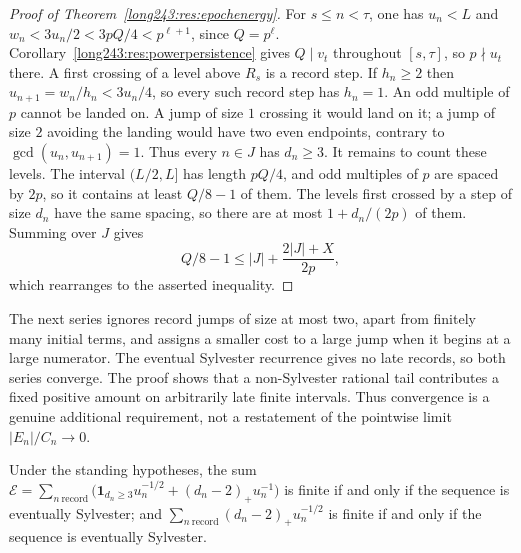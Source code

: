 \documentclass[11pt]{article}
\begin{document}
\begin{proof}[Proof of Theorem~\ref{long243:res:epochenergy}]
For $s\le n<\tau$, one has $u_n<L$ and
$w_n<3u_n/2<3pQ/4<p^{\ell+1}$, since $Q=p^{\ell}$.
Corollary~\ref{long243:res:powerpersistence} gives $Q\mid v_t$ throughout
$[s,\tau]$, so $p\nmid u_t$ there. A first crossing of a level above $R_s$
is a record step. If $h_n\ge2$ then $u_{n+1}=w_n/h_n<3u_n/4$, so every
such record step has $h_n=1$.
An odd multiple of $p$ cannot be landed on. A jump of size $1$ crossing it
would land on it; a jump of size $2$ avoiding the landing would have two
even endpoints, contrary to $\gcd(u_n,u_{n+1})=1$. Thus every $n\in J$
has $d_n\ge3$.
It remains to count these levels. The interval $(L/2,L]$ has length
$pQ/4$, and odd multiples of $p$ are spaced by $2p$, so it contains
at least $Q/8-1$ of them. The levels first crossed by a step of size
$d_n$ have the same spacing, so
there are at most $1+d_n/(2p)$ of them. Summing over $J$ gives
\[
 Q/8-1\le |J|+\frac{2|J|+X}{2p},
\]
which rearranges to the asserted inequality.
\end{proof}

The next series ignores record jumps of size at most two, apart from
finitely many initial terms, and assigns a smaller cost to a large jump
when it begins at a large numerator. The eventual Sylvester recurrence gives no late records,
so both series converge. The proof shows that a non-Sylvester rational
tail contributes a fixed positive amount on arbitrarily late finite
intervals. Thus convergence is a genuine additional requirement, not a
restatement of the pointwise limit $|E_n|/C_n\to0$.

\begin{theorem}\label{long243:res:energycriterion}
Under the standing hypotheses, the sum
$\mathcal E=\sum_{n\ \mathrm{record}}\bigl(\mathbf 1_{d_n\ge3}u_n^{-1/2}
+(d_n-2)_+u_n^{-1}\bigr)$ is finite if and only if the sequence is eventually Sylvester; and
$\sum_{n\ \mathrm{record}}(d_n-2)_+u_n^{-1/2}$ is finite if and only if the sequence is eventually Sylvester.
\end{theorem}
\end{document}
